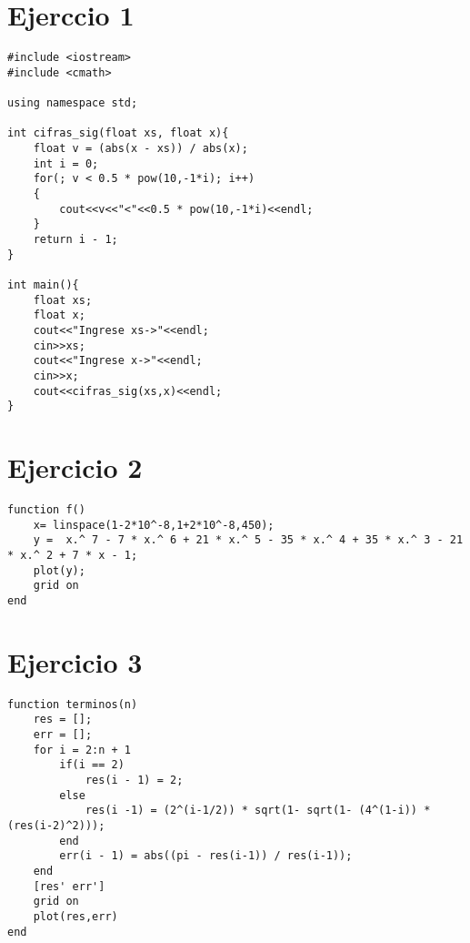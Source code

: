 \documentclass[a4paper,12pt]{article}
\begin{document}
\section{Ejerccio 1}

\begin{lstlisting}
#include <iostream>
#include <cmath>

using namespace std;

int cifras_sig(float xs, float x){
	float v = (abs(x - xs)) / abs(x);
	int i = 0;
	for(; v < 0.5 * pow(10,-1*i); i++)
	{
		cout<<v<<"<"<<0.5 * pow(10,-1*i)<<endl;
	}
	return i - 1;
}

int main(){
	float xs;
	float x;
	cout<<"Ingrese xs->"<<endl;
	cin>>xs;
	cout<<"Ingrese x->"<<endl;
	cin>>x;
	cout<<cifras_sig(xs,x)<<endl;
}
\end{lstlisting}

\section{Ejercicio 2}

\begin{lstlisting}
function f()
	x= linspace(1-2*10^-8,1+2*10^-8,450);
	y =  x.^ 7 - 7 * x.^ 6 + 21 * x.^ 5 - 35 * x.^ 4 + 35 * x.^ 3 - 21 * x.^ 2 + 7 * x - 1;
	plot(y);
	grid on
end
\end{lstlisting}

\section{Ejercicio 3}

\begin{lstlisting}
function terminos(n)
	res = [];
	err = [];
	for i = 2:n + 1
		if(i == 2)
			res(i - 1) = 2;
		else
			res(i -1) = (2^(i-1/2)) * sqrt(1- sqrt(1- (4^(1-i)) * (res(i-2)^2)));
		end
		err(i - 1) = abs((pi - res(i-1)) / res(i-1));
	end
	[res' err']
	grid on
	plot(res,err)
end
\end{lstlisting}
\end{document}
